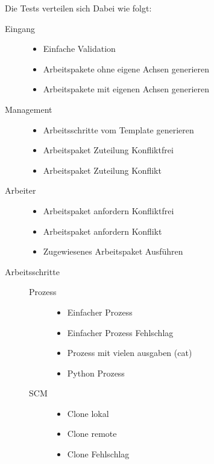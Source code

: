 Die Tests verteilen sich Dabei wie folgt:

\begin{description}
    \item[Eingang] \hfill
    \begin{itemize}
        \item Einfache Validation
        \item Arbeitspakete ohne eigene Achsen generieren
        \item Arbeitspakete mit eigenen Achsen generieren
    \end{itemize}
    \item[Management] \hfill
    \begin{itemize}
        \item Arbeitsschritte vom Template generieren
        \item Arbeitspaket Zuteilung Konfliktfrei
        \item Arbeitspaket Zuteilung Konflikt
    \end{itemize}
    \item[Arbeiter] \hfill
    \begin{itemize}
        \item Arbeitspaket anfordern Konfliktfrei
        \item Arbeitspaket anfordern Konflikt
        \item Zugewiesenes Arbeitspaket Ausführen
    \end{itemize}
    \item[Arbeitsschritte] \hfill
    \begin{description}
        \item[Prozess] \hfill
        \begin{itemize}
            \item Einfacher Prozess
            \item Einfacher Prozess Fehlschlag
            \item Prozess mit vielen ausgaben (cat)
            \item Python Prozess
        \end{itemize}
        \item[SCM] \hfill
        \begin{itemize}
            \item Clone lokal
            \item Clone remote
            \item Clone Fehlschlag
        \end{itemize}
    \end{description}
\end{description}

